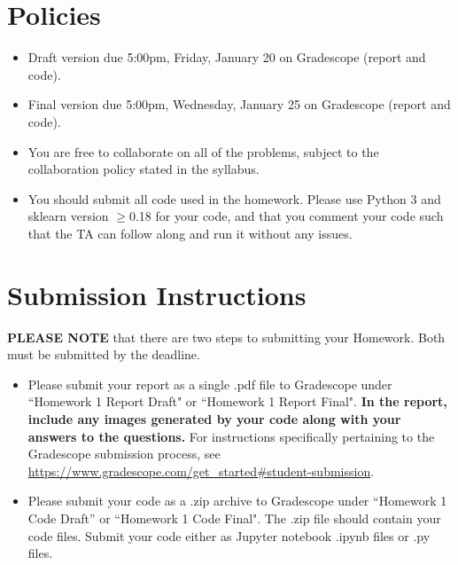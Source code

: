 \newif\ifshowsolutions
\showsolutionsfalse




\pagestyle{fancy}

\section*{Policies}
\begin{itemize}
	\item Draft version due 5:00pm, Friday, January 20 on Gradescope (report and code).
	\item Final version due 5:00pm, Wednesday, January 25 on Gradescope (report and code).
	\item You are free to collaborate on all of the problems, subject to the collaboration policy stated in the syllabus.
	\item You should submit all code used in the homework.
	      Please use Python 3 and sklearn version $\geq$0.18 for your code, and that you comment your code such that the TA can follow along and run it without any issues.
\end{itemize}

\section*{Submission Instructions}
\textbf{PLEASE NOTE} that there are two steps to submitting your Homework.
Both must be submitted by the deadline.

\begin{itemize}
	\item Please submit your report as a single .pdf file to Gradescope under ``Homework 1 Report Draft" or ``Homework 1 Report Final".
	      \textbf{In the report, include any images generated by your code along with your answers to the questions.}
	      For instructions specifically pertaining to the Gradescope submission process, see \url{https://www.gradescope.com/get_started#student-submission}.
	\item Please submit your code as a .zip archive to Gradescope under ``Homework 1 Code Draft'' or ``Homework 1 Code Final".
	      The .zip file should contain your code files.
	      Submit your code either as Jupyter notebook .ipynb files or .py files.
\end{itemize}

